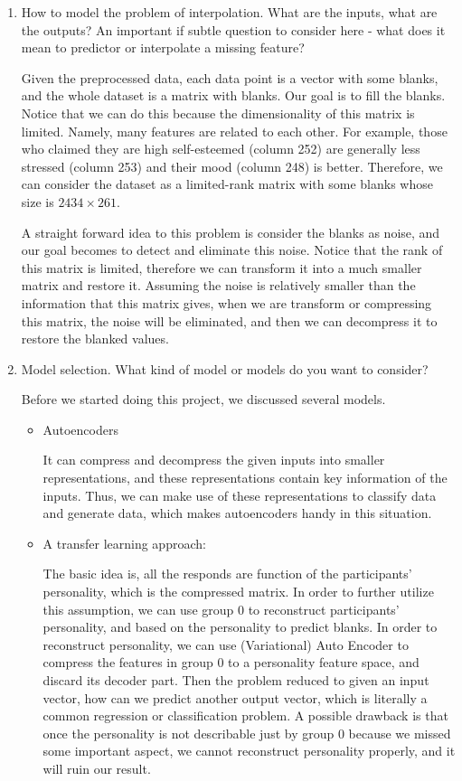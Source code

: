 \documentclass[11pt, a4paper]{article}
\makeatletter
\def\namedlabel#1#2{\begingroup
	\def\@currentlabel{#2}%
	\phantomsection\label{#1}\endgroup
}
\makeatother
\begin{document}
\begin{enumerate}
	\item{How to model the problem of interpolation. What are the inputs, what are the outputs? An important if subtle question to consider here - what does it mean to predictor or interpolate a missing feature?}
	\namedlabel{interpolation}{Formalization of interpolation}
	\par{Given the preprocessed data, each data point is a vector with some blanks, and the whole dataset is a matrix with blanks. Our goal is to fill the blanks. Notice that we can do this because the dimensionality of this matrix is limited. Namely, many features are related to each other. For example, those who claimed they are high self-esteemed (column 252) are generally less stressed (column 253) and their mood (column 248) is better. Therefore, we can consider the dataset as a limited-rank matrix with some blanks whose size is $2434 \times 261$.}
	\par{A straight forward idea to this problem is consider the blanks as noise, and our goal becomes to detect and eliminate this noise. Notice that the rank of this matrix is limited, therefore we can transform it into a much smaller matrix and restore it. Assuming the noise is relatively smaller than the information that this matrix gives, when we are transform or compressing this matrix, the noise will be eliminated, and then we can decompress it to restore the blanked values.}
	
	\item{Model selection. What kind of model or models do you want to consider?}
	\par{Before we started doing this project, we discussed several models.}
	\begin{itemize}
		\item {Autoencoders}
		\par{It can compress and decompress the given inputs into smaller representations, and these representations contain key information of the inputs. Thus, we can make use of these representations to classify data and generate data, which makes autoencoders handy in this situation.}
		\item {A transfer learning approach:}
		\par{The basic idea is, all the responds are function of the participants’ personality, which is the compressed matrix. In order to further utilize this assumption, we can use group 0 to reconstruct participants’ personality, and based on the personality to predict blanks. In order to reconstruct personality, we can use (Variational) Auto Encoder to compress the features in group 0 to a personality feature space, and discard its decoder part. Then the problem reduced to given an input vector, how can we predict another output vector, which is literally a common regression or classification problem. A possible drawback is that once the personality is not describable just by group 0 because we missed some important aspect, we cannot reconstruct personality properly, and it will ruin our result.}
		

\end{itemize}
\end{enumerate}
\end{document}

